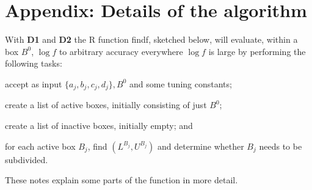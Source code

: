 \documentclass[ejs]{imsart}
\newcommand{\textcompute}{\textsf}
\newcommand{\RL}{f}
\newcommand{\logRL}{\log\RL}
\begin{document}
\section{Appendix: Details of the algorithm}
With \textbf{D1} and \textbf{D2} the \textcompute{R} function \textcompute{findf}, sketched below, will evaluate, within a box $B^0$, $\logRL$ to arbitrary accuracy everywhere $\logRL$ is large by performing the following tasks:
\begin{enumerate*}[label=(\alph*)]
\item accept as input $\{a_j, b_j, c_j, d_j\}, B^0$ and some tuning constants;
\item create a list of active boxes, initially consisting of just $B^0$;
\item create a list of inactive boxes, initially empty; and
\item for each active box $B_j$, find $(L^{B_j}, U^{B_j})$ and determine whether $B_j$ needs to be subdivided.
\end{enumerate*}
 These notes explain some parts of the function in more detail.
\end{document}
